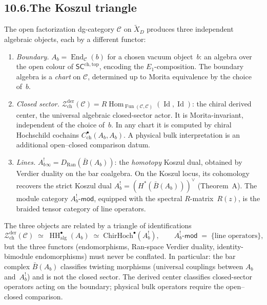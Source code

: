 \documentclass[11pt]{report}
\theoremstyle{definition}
\theoremstyle{remark}
\providecommand{\cZ}{\mathcal{Z}}
\providecommand{\barB}{\bar{B}}
\numberwithin{equation}{section}
\begin{document}
\subsection*{10.6.\enspace The Koszul triangle}

The open factorization dg-category $\mathcal C$ on
$\widetilde{X}_D$ produces three independent algebraic objects,
each by a different functor:
\begin{enumerate}[label=\textup{(\roman*)},nosep]
\item \emph{Boundary.} $A_b = \operatorname{End}_{\mathcal C}(b)$
 for a chosen vacuum object~$b$: an algebra over the open colour
 of $\mathsf{SC}^{\mathrm{ch,top}}$, encoding the
 $E_1$-composition. The boundary algebra is a \emph{chart} on
 $\mathcal C$, determined up to Morita equivalence by the choice
 of~$b$.
\item \emph{Closed sector.}
 $\cZ^{\mathrm{der}}_{\mathrm{ch}}(\mathcal C)
 = R\!\operatorname{Hom}_{\operatorname{Fun}(\mathcal C,\mathcal C)}
 (\operatorname{Id}, \operatorname{Id})$:
 the chiral derived center, the universal algebraic closed-sector
 actor. It is Morita-invariant, independent of the choice of~$b$.
 In any chart it is computed by chiral Hochschild cochains
 $C^\bullet_{\mathrm{ch}}(A_b, A_b)$. A physical bulk
 interpretation is an additional open--closed comparison datum.
\item \emph{Lines.}
 $A_b^{!}{}_\infty = D_{\operatorname{Ran}}(\barB(A_b))$: the
 \emph{homotopy} Koszul dual, obtained by Verdier duality on the
 bar coalgebra. On the Koszul locus, its cohomology recovers the
 strict Koszul dual $A_b^! = (H^*(\barB(A_b)))^\vee$ (Theorem~A).
 The module category $A_b^!\text{-}\mathsf{mod}$, equipped with
 the spectral $R$-matrix~$R(z)$, is the braided tensor category
 of line operators.
\end{enumerate}
The three objects are related by a triangle of identifications
\[
\cZ^{\mathrm{der}}_{\mathrm{ch}}(\mathcal C)
\;\simeq\;
\operatorname{HH}^\bullet_{\mathrm{alg}}(A_b)
\;\simeq\;
\mathrm{ChirHoch}^\bullet(A_b^!),
\qquad
A_b^!\text{-}\mathsf{mod}\;=\;\{\text{line operators}\},
\]
but the three functors (endomorphisms, Ran-space Verdier
duality, identity-bimodule endomorphisms) must never be
conflated. In particular: the bar complex $\barB(A_b)$ classifies
twisting morphisms (universal couplings between $A_b$ and~$A_b^!$)
and is not the closed sector. The derived center classifies
closed-sector operators acting on the boundary; physical bulk
operators require the open--closed comparison.
\end{document}
